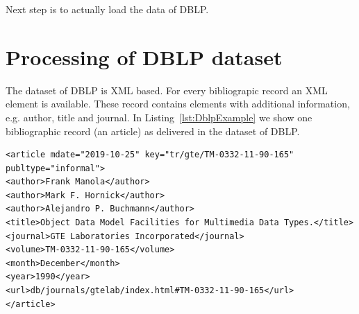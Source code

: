 \documentclass{ou-report}
\begin{document}
Next step is to actually load the data of DBLP.

\section{Processing of DBLP dataset}
The dataset of DBLP is XML based. For every bibliograpic record an XML element 
is available. These record contains elements with additional information, e.g. 
author, title and journal. In Listing~\ref{lst:DblpExample} we show one 
bibliographic record (an article) as delivered in the dataset of DBLP.

\lstset{language=XML}
\begin{lstlisting}[caption={DBLP bibliografic record example},label={lst:DblpExample}]
<article mdate="2019-10-25" key="tr/gte/TM-0332-11-90-165" publtype="informal">
<author>Frank Manola</author>
<author>Mark F. Hornick</author>
<author>Alejandro P. Buchmann</author>
<title>Object Data Model Facilities for Multimedia Data Types.</title>
<journal>GTE Laboratories Incorporated</journal>
<volume>TM-0332-11-90-165</volume>
<month>December</month>
<year>1990</year>
<url>db/journals/gtelab/index.html#TM-0332-11-90-165</url>
</article>
\end{lstlisting}
\end{document}
